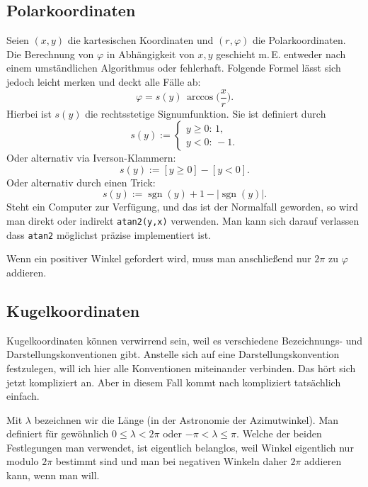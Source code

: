 \documentclass[a4paper,11pt,fleqn]{article}
\begin{document}
\subsection{Polarkoordinaten}
Seien $(x,y)$ die kartesischen Koordinaten und $(r,\varphi)$
die Polarkoordinaten. Die Berechnung von $\varphi$ in
Abhängigkeit von $x,y$ geschieht m.\,E. entweder nach
einem umständlichen Algorithmus oder fehlerhaft.
Folgende Formel lässt sich jedoch leicht merken und deckt
alle Fälle ab:
\begin{equation}
\varphi = s(y)\,\arccos\Big(\frac{x}{r}\Big).
\end{equation}
Hierbei ist $s(y)$ die rechtsstetige
Signumfunktion. Sie ist definiert durch
\begin{equation}
s(y):=
\begin{cases}
y{\ge}0\colon\,1,\\
y{<}0\colon\,{-}1.
\end{cases}
\end{equation}
Oder alternativ via Iverson-Klammern:
\begin{equation}
s(y):=[y{\ge}0]-[y{<}0].
\end{equation}
Oder alternativ durch einen Trick:
\begin{equation}
s(y) := \operatorname{sgn}(y)+1-|\operatorname{sgn}(y)|.
\end{equation}
Steht ein Computer zur Verfügung, und das ist der Normalfall geworden,
so wird man direkt oder indirekt \verb|atan2(y,x)| verwenden.
Man kann sich darauf verlassen dass \verb|atan2| möglichst präzise
implementiert ist.

Wenn ein positiver Winkel gefordert wird, muss man
anschließend nur $2\pi$ zu $\varphi$ addieren.


\subsection{Kugelkoordinaten}

Kugelkoordinaten können verwirrend sein, weil es verschiedene
Bezeichnungs- und Darstellungskonventionen gibt. Anstelle sich auf eine
Darstellungskonvention festzulegen, will ich hier alle Konventionen
miteinander verbinden. Das hört sich jetzt kompliziert an. Aber in
diesem Fall kommt nach kompliziert tatsächlich einfach.

Mit $\lambda$ bezeichnen wir die Länge (in der Astronomie der
Azimutwinkel). Man definiert für gewöhnlich $0\le\lambda<2\pi$ oder
$-\pi<\lambda\le\pi$. Welche der beiden Festlegungen man verwendet,
ist eigentlich belanglos, weil Winkel eigentlich nur modulo $2\pi$
bestimmt sind und man bei negativen Winkeln daher $2\pi$ addieren
kann, wenn man will.
\end{document}

